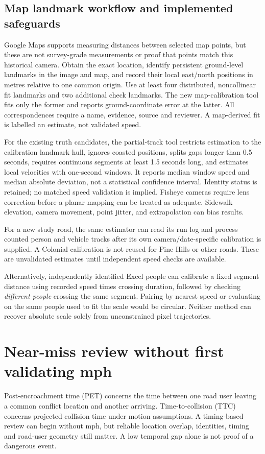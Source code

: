 \documentclass[11pt,letterpaper]{article}
\begin{document}
\subsection{Map landmark workflow and implemented safeguards}
Google Maps supports measuring distances between selected map points\cite{maps}, but these are not survey-grade measurements or proof that points match this historical camera. Obtain the exact location, identify persistent ground-level landmarks in the image and map, and record their local east/north positions in metres relative to one common origin. Use at least four distributed, noncollinear fit landmarks and two additional check landmarks. The new map-calibration tool fits only the former and reports ground-coordinate error at the latter. All correspondences require a name, evidence, source and reviewer. A map-derived fit is labelled an estimate, not validated speed.

For the existing truth candidates, the partial-track tool restricts estimation to the calibration landmark hull, ignores coasted positions, splits gaps longer than 0.5 seconds, requires continuous segments at least 1.5 seconds long, and estimates local velocities with one-second windows. It reports median window speed and median absolute deviation, not a statistical confidence interval. Identity status is retained; no matched speed validation is implied. Fisheye cameras require lens correction before a planar mapping can be treated as adequate. Sidewalk elevation, camera movement, point jitter, and extrapolation can bias results.

For a new study road, the same estimator can read its run log and process counted person and vehicle tracks after its own camera/date-specific calibration is supplied. A Colonial calibration is not reused for Pine Hills or other roads. These are unvalidated estimates until independent speed checks are available.

Alternatively, independently identified Excel people can calibrate a fixed segment distance using recorded speed times crossing duration, followed by checking \emph{different people} crossing the same segment. Pairing by nearest speed or evaluating on the same people used to fit the scale would be circular. Neither method can recover absolute scale solely from unconstrained pixel trajectories.

\section{Near-miss review without first validating mph}
Post-encroachment time (PET) concerns the time between one road user leaving a common conflict location and another arriving. Time-to-collision (TTC) concerns projected collision time under motion assumptions\cite{ssam}. A timing-based review can begin without mph, but reliable location overlap, identities, timing and road-user geometry still matter. A low temporal gap alone is not proof of a dangerous event.
\end{document}

